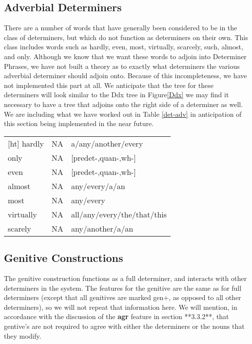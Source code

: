 \subsection{Adverbial Determiners}

There are a number of words that have generally been considered to be in the
class of determiners, but which do not function as determiners on their own.
This class includes words such as hardly, even, most, virtually, scarcely,
such, almost, and only.  Although we know that we want these words to adjoin
into Determiner Phrases, we have not built a theory as to exactly what
determiners the various adverbial determiner should adjoin onto.  Because of
this incompleteness, we have not implemented this part at all.  We anticipate
that the tree for these determiners will look similar to the Ddx tree in Figure\ref{Ddx}  we may find it necessary to have a tree that adjoins onto the
right side of a determiner as well.  We are including what we have worked out in Table \ref{det-adv}
in anticipation of this section being implemented in the near future.

\vspace*{0.3in}

\begin{tabular}{lll}[ht]
hardly&NA&a/any/another/every\\
only&NA&[predet-,quan-,wh-]\\
even&NA&[predet-,quan-,wh-]\\
almost&NA&any/every/a/an\\
most&NA&any/every\\
virtually&NA&all/any/every/the/that/this\\
scarely&NA&any/another/a/an\\
\end{tabular}
\label{det-adv}

\vspace*{0.3in}

\subsection{Genitive Constructions}

The genitive construction functions as a full determiner, and interacts with
other determiners in the system.  The features for the genitive are the same as
for full determiners (except that all genitives are marked gen$+$, as opposed to
all other determiners), so we will not repeat that information here.  We will
mention, in accordance with the discussion of the {\bf agr} feature in section
**3.3.2**, that gentive's are not required to agree with either the
determiners or the nouns that they modify.  

